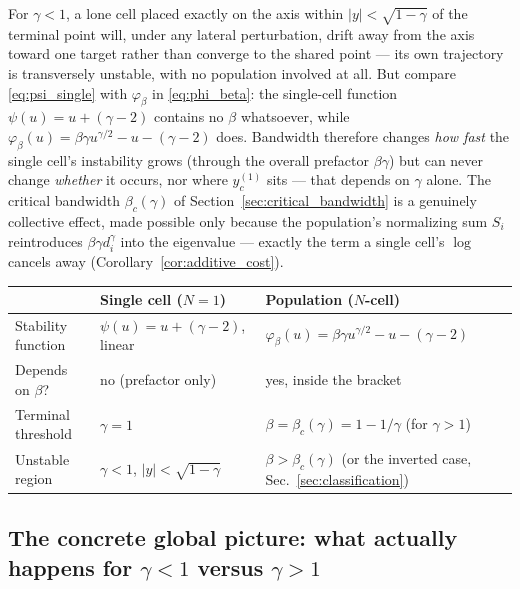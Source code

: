\documentclass[11pt,a4paper]{article}
\theoremstyle{plain}
\theoremstyle{definition}
\theoremstyle{remark}
\newcommand{\bw}{\beta}
\newcommand{\phib}{\varphi_{\bw}}
\newcommand{\bwc}{\beta_c}
\begin{document}
\begin{warningbox}
For $\gamma<1$, a lone cell placed exactly on the axis within
$|y|<\sqrt{1-\gamma}$ of the terminal point will, under any lateral
perturbation, drift away from the axis toward one target rather than
converge to the shared point — its own trajectory is transversely
unstable, with no population involved at all. But compare
\eqref{eq:psi_single} with $\phib$ in \eqref{eq:phi_beta}: the single-cell
function $\psi(u)=u+(\gamma-2)$ contains no $\bw$ whatsoever, while
$\phib(u)=\bw\gamma u^{\gamma/2}-u-(\gamma-2)$ does. Bandwidth therefore
changes \emph{how fast} the single cell's instability grows (through the
overall prefactor $\bw\gamma$) but can never change \emph{whether} it
occurs, nor where $y_c^{(1)}$ sits — that depends on $\gamma$ alone. The
critical bandwidth $\bwc(\gamma)$ of Section~\ref{sec:critical_bandwidth} is
a genuinely collective effect, made possible only because the population's
normalizing sum $S_i$ reintroduces $\bw\gamma d_i^\gamma$ into the
eigenvalue — exactly the term a single cell's $\log$ cancels away
(Corollary~\ref{cor:additive_cost}).
\end{warningbox}

\begin{center}
\renewcommand{\arraystretch}{1.3}
\begin{tabular}{@{}lll@{}}
\toprule
& \textbf{Single cell ($N=1$)} & \textbf{Population ($N$-cell)} \\
\midrule
Stability function & $\psi(u)=u+(\gamma-2)$, linear & $\phib(u)=\bw\gamma u^{\gamma/2}-u-(\gamma-2)$ \\
Depends on $\bw$? & no (prefactor only) & yes, inside the bracket \\
Terminal threshold & $\gamma=1$ & $\bw=\bwc(\gamma)=1-1/\gamma$ (for $\gamma>1$) \\
Unstable region & $\gamma<1$, $|y|<\sqrt{1-\gamma}$ & $\bw>\bwc(\gamma)$ (or the inverted case, Sec.~\ref{sec:classification}) \\
\bottomrule
\end{tabular}
\end{center}

\subsection{The concrete global picture: what actually happens for $\gamma<1$ versus $\gamma>1$}
\label{sec:single_cell_global}
\end{document}
